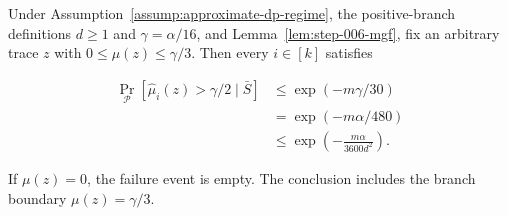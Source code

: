 \begin{lemma}\label{lem:step-006-low-tail}
Under Assumption~\ref{assump:approximate-dp-regime}, the positive-branch
definitions \(d\geq1\) and \(\gamma=\alpha/16\), and
Lemma~\ref{lem:step-006-mgf}, fix an arbitrary trace \(z\) with
\(0\leq\mu(z)\leq\gamma/3\).  Then every \(i\in[k]\) satisfies

\[
\begin{aligned}
 \Pr_{\mathcal P}
 [\widehat\mu_i(z)>\gamma/2\mid\bar S]
 &\leq \exp(-m\gamma/30)\\
 &=\exp(-m\alpha/480)\\
 &\leq\exp\!\left(-\frac{m\alpha}{3600d^2}\right).
\end{aligned}
\tag{10}
\]

If \(\mu(z)=0\), the failure event is empty.  The conclusion includes the
branch boundary \(\mu(z)=\gamma/3\).


\end{lemma}

